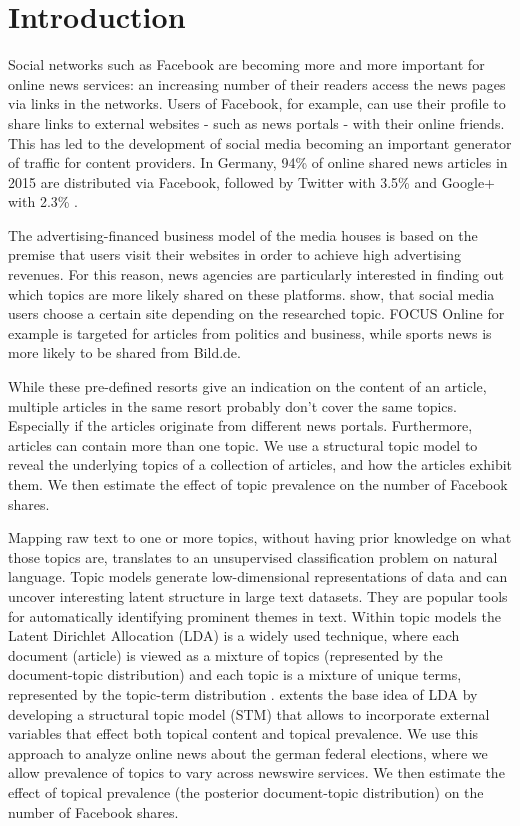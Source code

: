 \documentclass[12pt,a4paper,notitlepage]{article}
\begin{document}
\section{Introduction}

Social networks such as Facebook are becoming more and more important for online news services: an increasing number of their readers access the news pages via links in the networks. Users of Facebook, for example, can use their profile to share links to external websites - such as news portals - with their online friends. This has led to the development of social media becoming an important generator of traffic for content providers. In Germany, 94\% of online shared news articles in 2015 are distributed via Facebook, followed by Twitter with 3.5\% and Google+ with 2.3\% \citep{schiller_development_2016}. 

The advertising-financed business model of the media houses is based on the premise that users visit their websites in order to achieve high advertising revenues. For this reason, news agencies are particularly interested in finding out which topics are more likely shared on these platforms. \citet{schiller_development_2016} show, that social media users choose a certain site depending on the researched topic. FOCUS Online for example is targeted for articles from politics and business, while sports news is more likely to be shared from Bild.de. 

While these pre-defined resorts give an indication on the content of an article, multiple articles in the same resort probably don't cover the same topics. Especially if the articles originate from different news portals. Furthermore, articles can contain more than one topic. We use a structural topic model to reveal the underlying topics of a collection of articles, and how the articles exhibit them. We then estimate the effect of topic prevalence on the number of Facebook shares. 

Mapping raw text to one or more topics, without having prior knowledge on what those topics are, translates to an unsupervised classification problem on natural language. Topic models generate low-dimensional representations of data and can uncover interesting latent structure in large text datasets. They are popular tools for automatically identifying prominent themes in text. Within topic models the Latent Dirichlet Allocation (LDA) is a widely used technique, where each document (article) is viewed as a mixture of topics (represented by the document-topic distribution) and each topic is a mixture of unique terms, represented by the topic-term distribution \citep{blei_latent_2003}. \citet{roberts_model_2016} extents the base idea of LDA by developing a structural topic model (STM) that allows to incorporate external variables that effect both topical content and topical prevalence. We use this approach to analyze online news about the german federal elections, where we allow prevalence of topics to vary across newswire services. We then estimate the effect of topical prevalence (the posterior document-topic distribution) on the number of Facebook shares.
\end{document}
